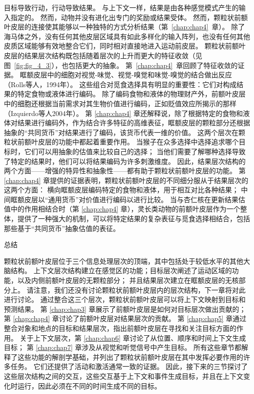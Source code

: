 目标导致行动，行动导致结果。
与上下文一样，结果是由各种感觉模式产生的输入指定的。
然而，动物并没有进化出专门的奖励或结果受体。
然而，颗粒状前额叶皮层的连接使其能够以一种独特的方式分析结果（第~\ref{chap:chap4}~章）。
除了海马体之外，没有任何其他皮层区域具有如此多样化的输入阵列，也没有任何其他皮质区域能够有效地整合它们，同时相对直接地进入运动前皮层。
颗粒状前额叶皮层的结果层次结构既包括随着层次的上升而更大的特征收敛（见图~\ref{fig:fig_4_3}），也包括更大的抽象。
第~\ref{chap:chap4}~章回顾了特征收敛的证据。
眶额皮层中的细胞对视觉-味觉、视觉-嗅觉和味觉-嗅觉的结合做出反应（Rolls等人，1994年）。
这些组合对觅食选择具有明显的重要性：它们对构成结果的特定食物或液体进行编码。
除了编码食物和液体的物理财产外，前额叶皮层中的细胞还根据当前需求对其生物价值进行编码，正如贬值效应所揭示的那样（Izquierdo等人2004年）。
第 \ref{chap:chap4} 章还解释说，除了根据特定的食物和液体对结果进行编码外，作为结合许多特征的高维表征，眶额皮层的颗粒部分还根据抽象的“共同货币”对结果进行了编码，该货币代表一维的价值。
这两个层次在颗粒状前额叶皮层的功能中都起着重要作用。
当猴子在众多选择中选择追求哪个目标时，它们可以用抽象的估值来比较自己的选择；
当他们需要了解哪种选择导致了特定的结果时，他们可以将结果编码为许多刺激维度。
因此，结果层次结构的两个方面——增强的特异性和抽象性——都有助于颗粒状前额叶皮层的功能。
第 \ref{chap:chap4} 章提供的证据表明，颗粒状前额叶皮层的不同细分服从于结果层次的这两个方面：
横向眶额皮层编码特定的食物和液体，用于相互对比各种结果；
中间眶额皮层以“通用货币”对价值进行编码以进行比较。
当与杏仁核在更新结果估值中的作用相结合时（第 \ref{chap:chap4} 章），灵长类动物的前额叶皮层作为一个整体，提供了一种强大的机制，可以将特定结果的复杂表征与觅食选择相结合，包括那些基于“共同货币”抽象估值的表征。



总结

颗粒状前额叶皮层位于三个信息处理层次的顶端，其中包括处于较低水平的其他大脑结构。
上下文层次结构建立在感觉区的功能；目标层次阐述了运动区域的功能，以及内侧前额叶皮层的无颗粒部分；
并且结果层次建立在眶额皮层的无核部分上。
请注意，我们还没有讨论颗粒状前额叶皮层内的层次结构，下一章将对此进行讨论。
通过整合这三个层次，颗粒状前额叶皮层可以将上下文映射到目标和预测结果。
第 \ref{chap:chap3} 章展示了前额叶皮层是如何对目标层次做出贡献的；
第 \ref{chap:chap4} 章讨论了前额叶皮层对结果层次的贡献。
第 \ref{chap:chap5} 章通过整合对象和地点的目标和结果层次，指出前额叶皮层在寻找和关注目标方面的作用。
关于上下文层次，第 \ref{chap:chap6} 章讨论了从位置、顺序和时间上下文生成目标；
第 \ref{chap:chap7} 章涉及从视觉和听觉信号中产生目标。
所有这些章节都解释了这些功能的解剖学基础，并列出了颗粒状前额叶皮层在其中发挥必要作用的许多任务。
它们还提供了活动和激活通常一致的证据。
因此，接下来的三节探讨了这些层次结构之间的交互，这些交互基于上下文和事件生成目标，并且在上下文变化时运行，因此必须在不同的时间生成不同的目标。



